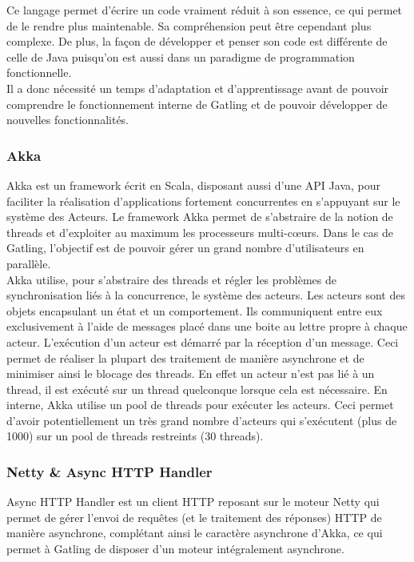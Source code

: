Ce langage permet d'écrire un code vraiment réduit à son essence, ce qui permet de le rendre plus maintenable. Sa compréhension peut être cependant plus complexe. De plus, la façon de développer et penser son code est différente de celle de Java puisqu'on est aussi dans un paradigme de programmation fonctionnelle.\\

Il a donc nécessité un temps d'adaptation et d'apprentissage \cite{proginscala} avant de pouvoir comprendre le fonctionnement interne de Gatling et de pouvoir développer de nouvelles fonctionnalités.

\subsubsection{Akka}

Akka \cite{akka} est un framework écrit en Scala, disposant aussi d'une API Java, pour faciliter la réalisation d'applications fortement concurrentes en s'appuyant sur le système des Acteurs. Le framework Akka permet de s'abstraire de la notion de threads et d'exploiter au maximum les processeurs multi-cœurs. Dans le cas de Gatling, l'objectif est de pouvoir gérer un grand nombre d'utilisateurs en parallèle.\\

Akka utilise, pour s'abstraire des threads et régler les problèmes de synchronisation liés à la concurrence, le système des acteurs. Les acteurs sont des objets encapsulant un état et un comportement. Ils communiquent entre eux exclusivement à l'aide de messages placé dans une boite au lettre propre à chaque acteur. L'exécution d'un acteur est démarré par la réception d'un message. Ceci permet de réaliser la plupart des traitement de manière asynchrone et de minimiser ainsi le blocage des threads. En effet un acteur n'est pas lié à un thread, il est exécuté sur un thread quelconque lorsque cela est nécessaire. En interne, Akka utilise un pool de threads pour exécuter les acteurs. Ceci permet d'avoir potentiellement un très grand nombre d'acteurs qui s'exécutent (plus de 1000) sur un pool de threads restreints (30 threads).

\subsubsection{Netty \& Async HTTP Handler}

Async HTTP Handler est un client HTTP reposant sur le moteur Netty qui permet de gérer l'envoi de requêtes (et le traitement des réponses) HTTP de manière asynchrone, complétant ainsi le caractère asynchrone d'Akka, ce qui permet à Gatling de disposer d'un moteur intégralement asynchrone. 

